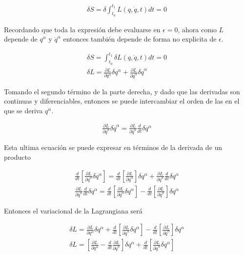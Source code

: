 \begin{gather*}
    \delta S = \delta \int_{t_0}^{t_1} L(q,\dot{q},t)dt = 0
\end{gather*}

Recordando que toda la expresión debe evaluarse en $\epsilon = 0$, ahora como $L$ depende de $q^{\alpha}$ y $\dot{q}^{\alpha}$ entonces también depende de forma no explicita de $\epsilon$.

\begin{gather*}
    \delta S = \int_{t_0}^{t_1} \delta L(q,\dot{q},t)dt = 0\\
    \delta L = \frac{\partial L}{\partial q^{\alpha}}\delta q^{\alpha} + \frac{\partial L}{\partial \dot{q}^{\alpha}}\delta \dot{q}^{\alpha}
\end{gather*}

Tomando el segundo término de la parte derecha, y dado que las derivadas son continuas y diferenciables, entonces se puede intercambiar el orden de las en el que se deriva $q^{\alpha}$.

\begin{gather*}
    \frac{\partial L}{\partial \dot{q}^{\alpha}}\delta \dot{q}^{\alpha} = \frac{\partial L}{\partial \dot{q}^{\alpha}}\frac{d}{dt}\delta q^{\alpha} 
\end{gather*}

Esta ultima ecuación se puede expresar en términos de la derivada de un producto 

\begin{gather*}
    \frac{d}{dt}\left[\frac{\partial L}{\partial \dot{q}^{\alpha}}\delta q^{\alpha}\right] = \frac{d}{dt}\left[\frac{\partial L}{\partial \dot{q}^{\alpha}} \right]\delta q^{\alpha} + \frac{\partial L}{\partial \dot{q}^{\alpha}}\frac{d}{dt}\delta q^{\alpha}\\
    \frac{\partial L}{\partial \dot{q}^{\alpha}}\frac{d}{dt}\delta q^{\alpha} = \frac{d}{dt}\left[\frac{\partial L}{\partial \dot{q}^{\alpha}}\delta q^{\alpha}\right] - \frac{d}{dt}\left[\frac{\partial L}{\partial \dot{q}^{\alpha}} \right]\delta q^{\alpha}
\end{gather*}

Entonces el variacional de la Lagrangiana será 

\begin{gather*}
    \delta L = \frac{\partial L}{\partial q^{\alpha}}\delta q^{\alpha} +  \frac{d}{dt}\left[\frac{\partial L}{\partial \dot{q}^{\alpha}}\delta q^{\alpha}\right] - \frac{d}{dt}\left[\frac{\partial L}{\partial \dot{q}^{\alpha}} \right]\delta q^{\alpha}\\
    \delta L =  \left[ \frac{\partial L}{\partial q^{\alpha}}- \frac{d}{dt}\frac{\partial L}{\partial \dot{q}^{\alpha}} \right]\delta q^{\alpha} + \frac{d}{dt}\left[\frac{\partial L}{\partial \dot{q}^{\alpha}}\delta q^{\alpha}\right] 
\end{gather*}

